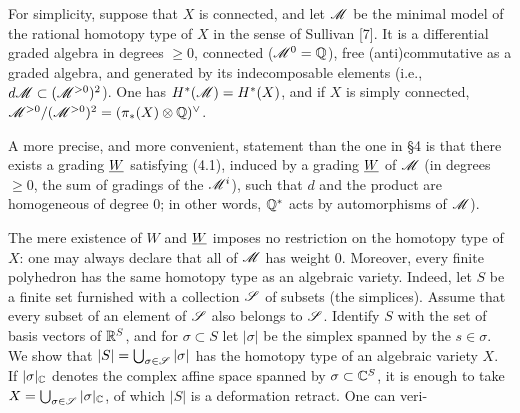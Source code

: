 \documentclass[8pt]{extarticle}
\begin{document}
 For simplicity, suppose that \(X\) is connected, and let \(\mathscr{M}\) be the minimal model of the rational homotopy type of \(X\) in the sense of Sullivan [7]. It is a differential graded algebra in degrees \(\ge0\), connected (\(\mathscr{M}^0=\mathbb{Q}\)), free (anti)commutative as a graded algebra, and generated by its indecomposable elements (i.e., \(d\mathscr{M}\subset(\mathscr{M}^{>0})^2\)). One has \(H^*(\mathscr{M})=H^*(X)\), and if \(X\) is simply connected, \(\mathscr{M}^{>0}/(\mathscr{M}^{>0})^2=(\pi_*(X)\otimes\mathbb{Q})^\vee\).

A more precise, and more convenient, statement than the one in §4 is that there exists a grading \(\underline{W}\) satisfying (4.1), induced by a grading \(\underline{W}\) of \(\mathscr{M}\) (in degrees \(\ge0\), the sum of gradings of the \(\mathscr{M}^i\)), such that \(d\) and the product are homogeneous of degree 0; in other words, \(\mathbb{Q}^*\) acts by automorphisms of \(\mathscr{M}\)).

 The mere existence of \(W\) and \(\underline{W}\) imposes no restriction on the homotopy type of \(X\): one may always declare that all of \(\mathscr{M}\) has weight 0. Moreover, every finite polyhedron has the same homotopy type as an algebraic variety. Indeed, let \(S\) be a finite set furnished with a collection \(\mathscr{S}\) of subsets (the simplices). Assume that every subset of an element of \(\mathscr{S}\) also belongs to \(\mathscr{S}\). Identify \(S\) with the set of basis vectors of \(\mathbb{R}^S\), and for \(\sigma\subset S\) let \(|\sigma|\) be the simplex spanned by the \(s\in\sigma\). We show that \(|S|=\bigcup_{\sigma\in\mathscr{S}}|\sigma|\) has the homotopy type of an algebraic variety \(X\). If \(|\sigma|_{\mathbb{C}}\) denotes the complex affine space spanned by \(\sigma\subset\mathbb{C}^S\), it is enough to take \(X=\bigcup_{\sigma\in\mathscr{S}}|\sigma|_{\mathbb{C}}\), of which \(|S|\) is a deformation retract. One can veri-
\EndSourcePage


\end{document}
